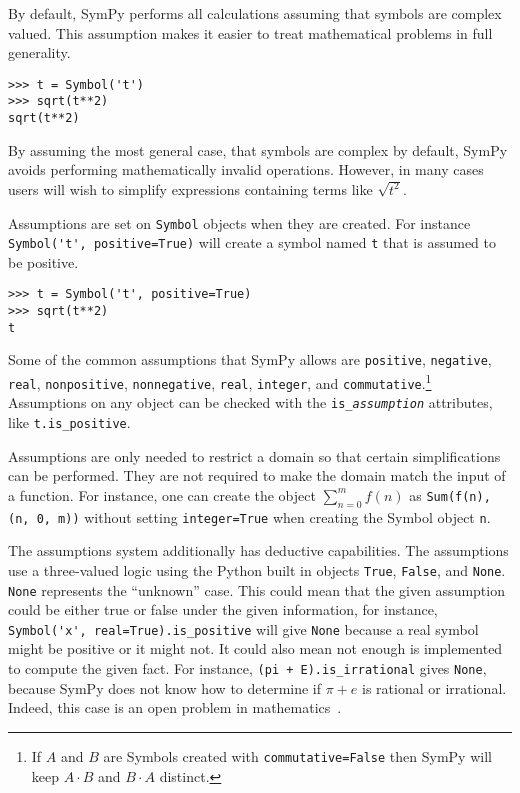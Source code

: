 By default, SymPy performs all calculations assuming that symbols are
complex valued. This assumption makes it easier to treat mathematical problems
in full generality.
\begin{verbatim}
>>> t = Symbol('t')
>>> sqrt(t**2)
sqrt(t**2)
\end{verbatim}

By assuming the most general case, that symbols are complex by default, SymPy
avoids performing mathematically invalid operations. However, in many cases
users will wish to simplify expressions containing terms like $\sqrt{t^2}$.

Assumptions are set on \texttt{Symbol} objects when they are created. For
instance \verb|Symbol('t', positive=True)| will create a symbol named
\texttt{t} that is assumed to be positive.
\begin{verbatim}
>>> t = Symbol('t', positive=True)
>>> sqrt(t**2)
t
\end{verbatim}

Some of the common assumptions that SymPy allows are \texttt{positive},
\texttt{negative}, \texttt{real}, \texttt{nonpositive}, \texttt{nonnegative},
\texttt{real}, \texttt{integer}, and \texttt{commutative}.\footnote{If $A$ and
$B$ are Symbols created with \texttt{commutative=False} then SymPy will keep
$A\cdot B$ and $B\cdot A$ distinct.} Assumptions on any object can be checked with the
\verb|is_|\texttt{\textit{assumption}} attributes, like \verb|t.is_positive|.

Assumptions are only needed to restrict a domain so that certain
simplifications can be performed. They are not required to make the domain match
the input of a function. For instance, one can create the object
$\sum_{n=0}^m f(n)$ as \verb|Sum(f(n), (n, 0, m))| without setting
\texttt{integer=True} when creating the Symbol object \texttt{n}.

The assumptions system additionally has deductive capabilities. The
assumptions use a three-valued logic using the Python built in objects
\texttt{True}, \texttt{False}, and \texttt{None}. \texttt{None} represents the
``unknown'' case. This could mean that the given assumption could be either
true or false under the given information, for instance,
\verb|Symbol('x', real=True).is_positive| will give \texttt{None} because a real
symbol might be positive or it might not. It could also mean not enough is
implemented to compute the given fact. For instance,
\verb|(pi + E).is_irrational| gives \texttt{None}, because SymPy does not know
how to determine if $\pi + e$ is rational or irrational. Indeed,
this case is an open problem in mathematics~\cite{lang1966introduction}.


